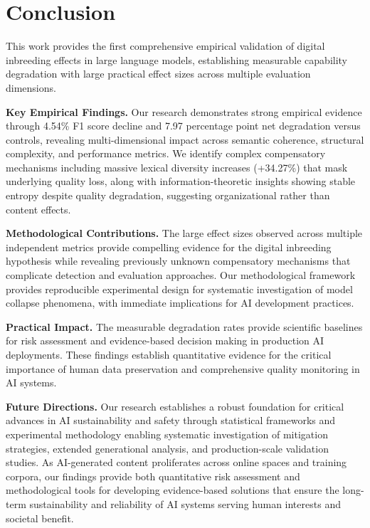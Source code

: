 \documentclass{article}
\begin{document}
\section{Conclusion}

This work provides the first comprehensive empirical validation of digital inbreeding effects in large language models, establishing measurable capability degradation with large practical effect sizes across multiple evaluation dimensions.

\textbf{Key Empirical Findings.} Our research demonstrates strong empirical evidence through 4.54\% F1 score decline and 7.97 percentage point net degradation versus controls, revealing multi-dimensional impact across semantic coherence, structural complexity, and performance metrics. We identify complex compensatory mechanisms including massive lexical diversity increases (+34.27\%) that mask underlying quality loss, along with information-theoretic insights showing stable entropy despite quality degradation, suggesting organizational rather than content effects.

\textbf{Methodological Contributions.} The large effect sizes observed across multiple independent metrics provide compelling evidence for the digital inbreeding hypothesis while revealing previously unknown compensatory mechanisms that complicate detection and evaluation approaches. Our methodological framework provides reproducible experimental design for systematic investigation of model collapse phenomena, with immediate implications for AI development practices.

\textbf{Practical Impact.} The measurable degradation rates provide scientific baselines for risk assessment and evidence-based decision making in production AI deployments. These findings establish quantitative evidence for the critical importance of human data preservation and comprehensive quality monitoring in AI systems.

\textbf{Future Directions.} Our research establishes a robust foundation for critical advances in AI sustainability and safety through statistical frameworks and experimental methodology enabling systematic investigation of mitigation strategies, extended generational analysis, and production-scale validation studies. As AI-generated content proliferates across online spaces and training corpora, our findings provide both quantitative risk assessment and methodological tools for developing evidence-based solutions that ensure the long-term sustainability and reliability of AI systems serving human interests and societal benefit.
\end{document}
